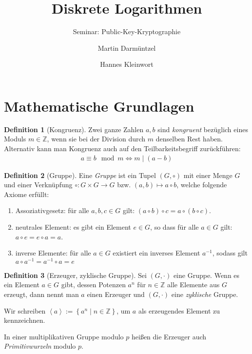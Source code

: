 \documentclass[
  a4paper,
  11pt,
]{scrartcl}
\title{Diskrete Logarithmen}
\subtitle{Seminar: Public-Key-Kryptographie}
\author{%
  Martin Darmüntzel \and Hannes Kleinwort
}
\theoremstyle{plain}
\theoremstyle{definition}
\newtheorem{definition}{Definition}
\theoremstyle{remark}
\newcommand{\Z}{\mathbb{Z}}
\begin{document}
\maketitle

\section{Mathematische Grundlagen}
\label{sec:mathematische_grundlagen}

\begin{definition}[Kongruenz]
  Zwei ganze Zahlen $a, b$ sind \emph{kongruent} bezüglich eines Moduls
  $m \in \Z$, wenn sie bei der Division durch $m$ denselben Rest haben.
  Alternativ kann man Kongruenz auch auf den Teilbarkeitsbegriff zurückführen:
  \begin{align*}
    a \equiv b \mod m \Leftrightarrow m \mid (a - b)
  \end{align*}
\end{definition}

\begin{definition}[Gruppe]
  Eine \emph{Gruppe} ist ein Tupel $(G, \circ)$ mit einer Menge $G$ und einer
  Verknüpfung $\circ: G \times G \to G$ bzw. $(a, b) \mapsto a \circ b$, welche
  folgende Axiome erfüllt:
  \begin{enumerate}
    \item Assoziativgesetz: für alle $a, b, c \in G$ gilt:
      $(a \circ b) \circ c = a \circ (b \circ c)$.
    \item neutrales Element: es gibt ein Element $e \in G$, so dass für
      alle $a \in G$ gilt: $a \circ e = e \circ a = a$.
    \item inverse Elemente: für alle $a \in G$ existiert ein inverses
      Element $a^{-1}$, sodass gilt $a \circ a^{-1} = a^{-1} \circ a = e$
  \end{enumerate}
\end{definition}

\begin{definition}[Erzeuger, zyklische Gruppe]
  Sei $(G, \cdot)$ eine Gruppe. Wenn es ein Element $a \in G$ gibt, dessen
  Potenzen $a^n$ für $n \in \Z$ alle Elemente aus $G$ erzeugt, dann nennt man
  $a$ einen Erzeuger und $(G, \cdot)$ eine \emph{zyklische} Gruppe.

  Wir schreiben
  $\left\langle a \right\rangle := \left\{ a^n \mid n \in \Z \right\}$,
  um $a$ als erzeugendes Element zu kennzeichnen.

  In einer multiplikativen Gruppe modulo $p$ heißen die Erzeuger auch
  \emph{Primitivwurzeln} modulo $p$.
\end{definition}
\end{document}
